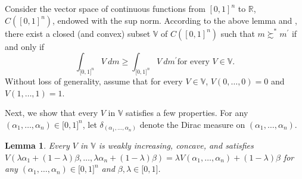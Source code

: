 \documentclass[12pt, notitlepage]{article}
\newtheorem{lemma}{Lemma}
\begin{document}
{Consider the vector space of continuous functions from $[0,1]^{n}$ to $%
\mathbb{R}$, $C([0,1]^{n})$, endowed with the sup norm. }According to the
above lemma and \cite{DubraMaccheroniOk04}, there exist a closed (and
convex) subset $\mathbb{V}$ of $C([0,1]^{n})$ such that $m\succsim ^{\ast
}m^{\prime }$ if and only if%
\begin{equation*}
\int_{\lbrack 0,1]^{n}}V~dm\geq \int_{\lbrack 0,1]^{n}}V~dm^{\prime }\text{
for every }V\in \mathbb{V}.
\end{equation*}%
Without loss of generality, assume that for every $V\in \mathbb{V}$, $%
V(0,\dots ,0)=0$ and $V(1,\dots ,1)=1$.

Next, we show that every $V$ in $\mathbb{V}$ satisfies a few properties. For
any $(\alpha _{1},\dots ,\alpha _{n})\in \lbrack 0,1]^{n}$, let $\delta
_{(\alpha _{1},\dots ,\alpha _{n})}$ denote the Dirac measure on $(\alpha
_{1},\dots ,\alpha _{n})$.

\begin{lemma}
Every $V$ in $\mathbb{V}$ is weakly increasing, concave, and satisfies $%
V(\lambda \alpha _{1}+(1-\lambda )\beta ,\dots ,\lambda \alpha
_{n}+(1-\lambda )\beta )=\lambda V(\alpha _{1},\dots ,\alpha
_{n})+(1-\lambda )\beta $ for any $(\alpha _{1},\dots ,\alpha _{n})\in
\lbrack 0,1]^{n}$ and $\beta ,\lambda \in \lbrack 0,1]$.
\end{lemma}
\end{document}
